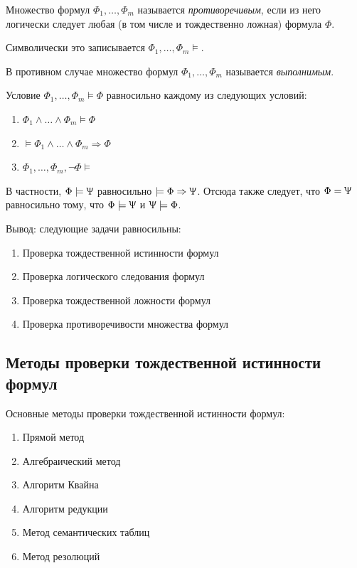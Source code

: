 \begin{definition}
    Множество формул $\Phi_1,\ldots,\Phi_m$ называется \textit{противоречивым}, если из него логически следует любая (в том числе и тождественно ложная) формула $\Phi$.

    Символически это записывается $\Phi_1,\ldots,\Phi_m\models $.

    В противном случае множество формул $\Phi_1,\ldots,\Phi_m$ называется \textit{выполнимым}.
\end{definition}

\begin{lemma}
    Условие $\Phi_1,\ldots,\Phi_m\models \Phi$ равносильно каждому из следующих условий:
    \begin{enumerate}
        \item $\Phi_1\land\ldots\land\Phi_m\models\Phi$
        \item $\models \Phi_1\land\ldots\land\Phi_m\Rightarrow\Phi$
        \item $\Phi_1,\ldots,\Phi_m,\lnot\Phi\models$
    \end{enumerate}

В частности, $\Phi\models\Uppsi$ равносильно $\models\Phi\Rightarrow\Uppsi$.
Отсюда также следует, что $\Phi=\Uppsi$ равносильно тому, что $\Phi\models\Uppsi$ и $\Uppsi\models\Phi$.
\end{lemma}

Вывод: следующие задачи равносильны:
\begin{enumerate}
    \item Проверка тождественной истинности формул
    \item Проверка логического следования формул
    \item Проверка тождественной ложности формул
    \item Проверка противоречивости множества формул
\end{enumerate}
\subsection*{Методы проверки тождественной истинности формул}
Основные методы проверки тождественной истинности формул:
\begin{enumerate}
    \item Прямой метод
    \item Алгебраический метод
    \item Алгоритм Квайна
    \item Алгоритм редукции
    \item Метод семантических таблиц
    \item Метод резолюций
\end{enumerate}
